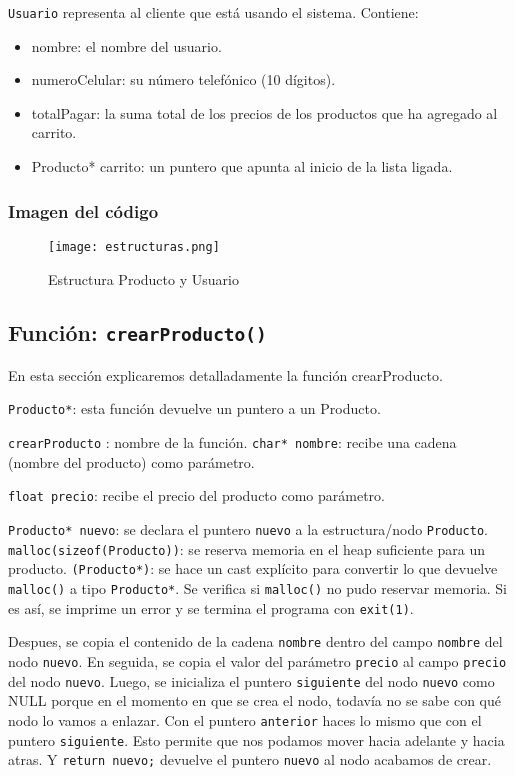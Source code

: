 \documentclass{article}
\begin{document}
\texttt{Usuario} representa al cliente que está usando el sistema. Contiene:
\begin{itemize}
\item \textbf{} nombre: el nombre del usuario.

\item \textbf{} numeroCelular: su número telefónico (10 dígitos).

\item \textbf{} totalPagar: la suma total de los precios de los productos que ha agregado al carrito.

\item \textbf{} Producto* carrito: un puntero que apunta al inicio de la lista ligada.
\end{itemize}
\subsubsection{Imagen del código}

\begin{figure}[!ht]
\centering
\texttt{[image: estructuras.png]}
\caption{Estructura Producto y Usuario}
\end{figure}


   \subsection{Función: \texttt{crearProducto()}}
   En esta sección explicaremos detalladamente la función crearProducto. 
   
   \texttt{Producto*}: esta función devuelve un puntero a un Producto. 
   
   \texttt{crearProducto} : nombre de la función. \texttt{char* nombre}: recibe una cadena (nombre del producto) como parámetro. 
   
   \texttt{float precio}: recibe el precio del producto como parámetro. 
   
   \texttt{Producto* nuevo}: se declara el puntero \texttt{nuevo} a la estructura/nodo \texttt{Producto}. \texttt{malloc(sizeof(Producto))}: se reserva memoria en el heap suficiente para un producto. \texttt{(Producto*)}: se hace un cast explícito para convertir lo que devuelve \texttt{malloc()} a tipo \texttt{Producto*}. Se verifica si \texttt{malloc()} no pudo reservar memoria. Si es así, se imprime un error y se termina el programa con \texttt{exit(1)}.

Despues, se copia el contenido de la cadena \texttt{nombre} dentro del campo \texttt{nombre} del nodo \texttt{nuevo}. En seguida, se copia el valor del parámetro \texttt{precio} al campo \texttt{precio} del nodo \texttt{nuevo}.
Luego, se inicializa el puntero \texttt{siguiente} del nodo \texttt{nuevo} como NULL porque en el momento en que se crea el nodo, todavía no se sabe con qué nodo lo vamos a enlazar.
Con el puntero \texttt{anterior} haces lo mismo que con el puntero \texttt{siguiente}. Esto permite que nos podamos mover hacia adelante y hacia atras. Y \texttt{return nuevo;} devuelve el puntero \texttt{nuevo} al nodo acabamos de crear. 
\end{document}
